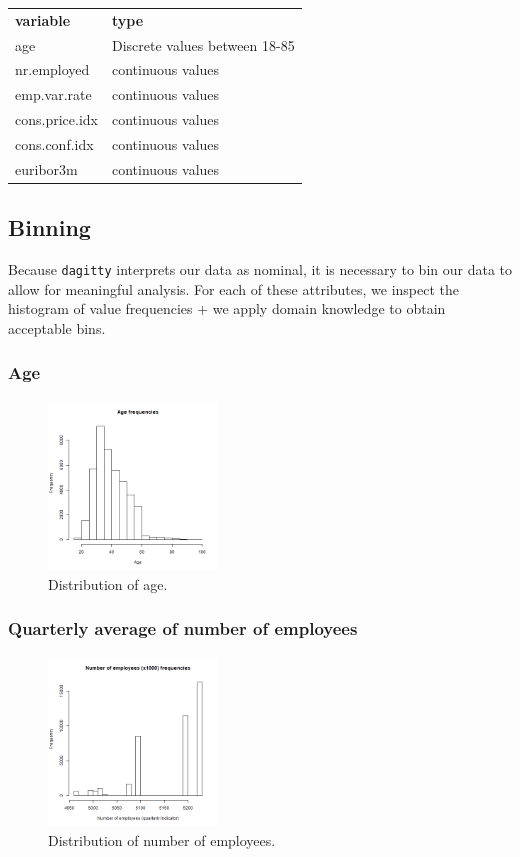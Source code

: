\documentclass[11pt]{article}
\begin{document}
\begin{multicols}{2}
    \begin{tabular}{ll}
        \textbf{variable} & \textbf{type} \\
        age & Discrete values between 18-85 \\
        nr.employed & continuous values \\
        emp.var.rate & continuous values \\
        cons.price.idx & continuous values \\
        cons.conf.idx & continuous values \\
        euribor3m & continuous values \\
    \end{tabular}

\subsection{Binning}
Because \texttt{dagitty} interprets our data as nominal, it is necessary to bin
our data to allow for meaningful analysis. For each of these attributes, we
inspect the histogram of value frequencies + we apply domain knowledge to obtain
acceptable bins.

\subsubsection{Age}
\begin{figure}[H]
	\centering
	\includegraphics[width=0.4\textwidth]{images/age}
	\caption{Distribution of age.}
	\label{fig:age}
\end{figure}

\subsubsection{Quarterly average of number of employees}
\begin{figure}[H]
	\centering
	\includegraphics[width=0.4\textwidth]{images/nr_employed}
	\caption{Distribution of number of employees.}
	\label{fig:nr_employed}
\end{figure}


\end{multicols}
\end{document}
